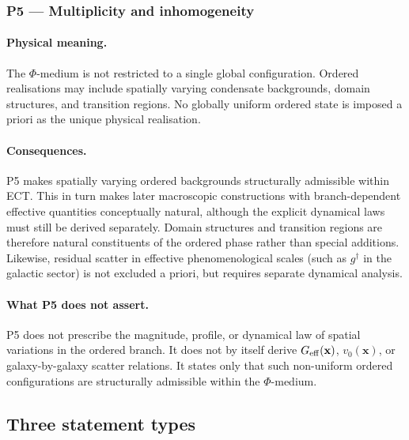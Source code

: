 \documentclass[11pt,a4paper]{article}
\numberwithin{equation}{section}
\begin{document}
\subsubsection*{P5 --- Multiplicity and inhomogeneity}

\paragraph{Physical meaning.}
The $\Phi$-medium is not restricted to a single global configuration.
Ordered realisations may include spatially varying condensate
backgrounds, domain structures, and transition regions.
No globally uniform ordered state is imposed a priori as the unique
physical realisation.

\paragraph{Consequences.}
P5 makes spatially varying ordered backgrounds structurally admissible
within ECT. This in turn makes later macroscopic constructions with
branch-dependent effective quantities conceptually natural, although the
explicit dynamical laws must still be derived separately. Domain structures and transition regions are therefore natural
constituents of the ordered phase rather than special additions.
Likewise, residual scatter in effective phenomenological scales
(such as $g^\dagger$ in the galactic sector) is not excluded a priori,
but requires separate dynamical analysis.

\paragraph{What P5 does not assert.}
P5 does not prescribe the magnitude, profile, or dynamical law of
spatial variations in the ordered branch.
It does not by itself derive $G_{\rm eff}(\mathbf{x})$,
$v_0(\mathbf{x})$, or galaxy-by-galaxy scatter relations.
It states only that such non-uniform ordered configurations are
structurally admissible within the $\Phi$-medium.

\subsection{Three statement types}
\label{subsec:statement_types}
\end{document}
